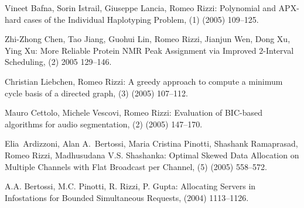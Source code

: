 \begin{etaremune}
  \item {\sc Vineet Bafna, Sorin Istrail, Giuseppe Lancia, Romeo Rizzi:}
   \newblock  Polynomial and APX-hard cases of the Individual Haplotyping Problem,
   (1) (2005) 109--125.

  \item {\sc Zhi-Zhong Chen, Tao Jiang, Guohui Lin, Romeo Rizzi,
                  Jianjun Wen, Dong Xu, Ying Xu:}
   \newblock  More Reliable Protein NMR Peak Assignment via Improved $2$-Interval Scheduling,
   (2) 2005 129--146.

  \item {\sc Christian Liebchen, Romeo Rizzi:}
   \newblock  A greedy approach to compute a minimum cycle basis
              of a directed graph,
   (3) (2005) 107--112.

  \item {\sc Mauro Cettolo, Michele Vescovi, Romeo Rizzi:}
   \newblock  Evaluation of BIC-based algorithms for audio segmentation,
   (2) (2005) 147--170.

  \item {\sc Elia~Ardizzoni, Alan A.~Bertossi, Maria Cristina Pinotti,
                  Shashank Ramaprasad,  Romeo Rizzi,  Madhusudana V.S. Shashanka:}
   \newblock  Optimal Skewed Data Allocation on Multiple Channels with Flat
              Broadcast per Channel,
   (5) (2005) 558--572.

  \item {\sc A.A. Bertossi, M.C. Pinotti, R. Rizzi, P. Gupta:} %
   \newblock  Allocating Servers in Infostations for Bounded Simultaneous Requests,
    (2004) 1113--1126.


\end{etaremune}

